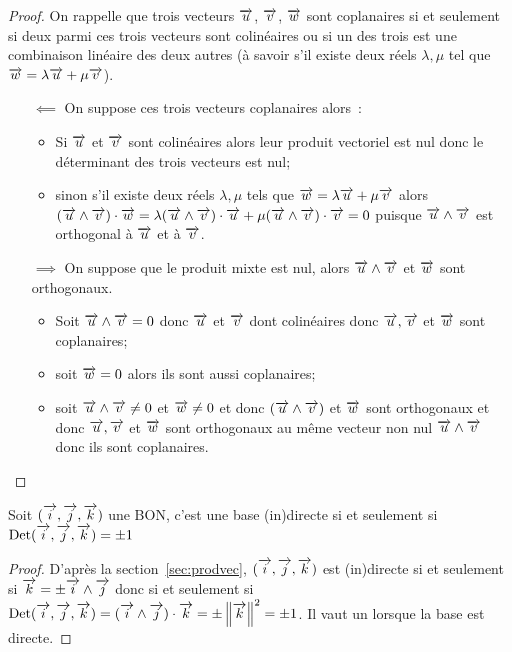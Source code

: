 \begin{proof}
  On rappelle que trois vecteurs \(\vu\), \(\vv\), \(\vw\) sont coplanaires si et seulement si deux parmi ces trois vecteurs sont colinéaires ou si un des trois est une combinaison linéaire des deux autres (à savoir s'il existe deux réels \(\lambda,\mu\) tel que \(\vw=\lambda\vu+\mu\vv\)).
  \begin{itemize}
  \item[\(\impliedby\)] On suppose ces trois vecteurs coplanaires alors~:
    \begin{itemize}
    \item Si \(\vu\) et \(\vv\) sont colinéaires alors leur produit vectoriel est nul donc le déterminant des trois vecteurs est nul;
    \item sinon s'il existe deux réels \(\lambda,\mu\) tels que \(\vw = \lambda\vu+\mu\vv\) alors \((\vu\wedge\vv)\cdot\vw=\lambda(\vu\wedge\vv)\cdot\vu+\mu(\vu\wedge\vv)\cdot\vv=0\) puisque \(\vu\wedge\vv\) est orthogonal à \(\vu\) et à \(\vv\).
    \end{itemize}
  \item[\(\implies\)] On suppose que le produit mixte est nul, alors \(\vu\wedge\vv\) et \(\vw\) sont orthogonaux. 
    \begin{itemize}
    \item Soit \(\vu\wedge\vv=0\) donc \(\vu\) et \(\vv\) dont colinéaires donc \(\vu,\vv\) et \(\vw\) sont coplanaires;
    \item soit \(\vw=0\) alors ils sont aussi coplanaires;
    \item soit \(\vu\wedge\vv \neq 0\) et \(\vw\neq 0\) et donc \((\vu\wedge\vv)\) et \(\vw\) sont \og orthogonaux \fg{} et donc \(\vu,\vv\) et \(\vw\) sont orthogonaux au même vecteur non nul \(\vu\wedge\vv\) donc ils sont coplanaires.
    \end{itemize}
  \end{itemize}
\end{proof}
\begin{prop}
  Soit \(\bondtrois\) une BON, c'est une base (in)directe si et seulement si \(\Det\bondtrois=\pm 1\)
\end{prop}
\begin{proof}
  D'après la section~\ref{sec:prodvec}, \(\bondtrois\) est (in)directe si et seulement si \(\vk=\pm\vi\wedge\vj\) donc si et seulement si \(\Det\bondtrois=(\vi\wedge\vj)\cdot\vk=\pm\norme{\vk}^2=\pm 1\). Il vaut un lorsque la base est directe.
\end{proof}

